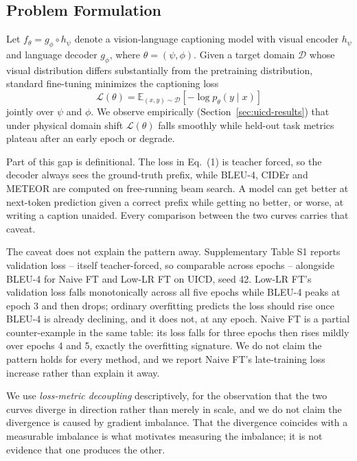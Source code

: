 \documentclass[journal]{IEEEtran}
\begin{document}
\subsection{Problem Formulation}
Let $f_\theta = g_\phi \circ h_\psi$ denote a vision-language
captioning model with visual encoder $h_\psi$ and language
decoder $g_\phi$, where $\theta = (\psi, \phi)$. Given a target
domain $\mathcal{D}$ whose visual distribution differs
substantially from the pretraining distribution, standard
fine-tuning minimizes the captioning loss
\begin{equation}
\mathcal{L}(\theta) = \mathbb{E}_{(x,y)\sim\mathcal{D}}
\left[-\log p_\theta(y \mid x)\right]
\end{equation}
jointly over $\psi$ and $\phi$. We observe empirically
(Section~\ref{sec:uicd-results}) that under physical domain shift
$\mathcal{L}(\theta)$ falls smoothly while held-out task metrics
plateau after an early epoch or degrade.

Part of this gap is definitional. The loss in Eq.~(1) is teacher
forced, so the decoder always sees the ground-truth prefix, while
BLEU-4, CIDEr and METEOR are computed on free-running beam search. A
model can get better at next-token prediction given a correct prefix
while getting no better, or worse, at writing a caption unaided. Every
comparison between the two curves carries that caveat.

The caveat does not explain the pattern away. Supplementary Table S1
reports validation loss -- itself teacher-forced, so comparable across
epochs -- alongside BLEU-4 for Naive FT and Low-LR FT on UICD, seed
42. Low-LR FT's validation loss falls monotonically across all five
epochs while BLEU-4 peaks at epoch 3 and then drops; ordinary
overfitting predicts the loss should rise once BLEU-4 is already
declining, and it does not, at any epoch. Naive FT is a partial
counter-example in the same table: its loss falls for three epochs
then rises mildly over epochs 4 and 5, exactly the overfitting
signature. We do not claim the pattern holds for every method, and we
report Naive FT's late-training loss increase rather than explain it
away.

We use \emph{loss-metric decoupling} descriptively, for the
observation that the two curves diverge in direction rather than
merely in scale, and we do not claim the divergence is caused by
gradient imbalance. That the divergence coincides with a
measurable imbalance is what motivates measuring the imbalance;
it is not evidence that one produces the other.
\end{document}
